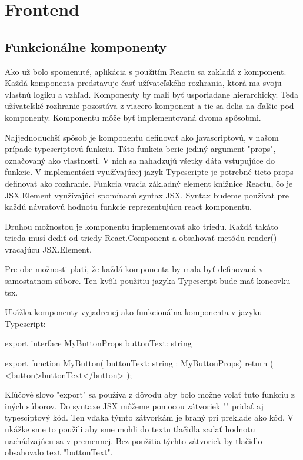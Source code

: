 \section{Frontend}

\subsection{Funkcionálne komponenty }

Ako už bolo spomenuté, aplikácia s použitím Reactu sa zakladá z komponent. Každá komponenta predstavuje časť užívateľského rozhrania, ktorá ma svoju vlastnú logiku a vzhľad. 
Komponenty by mali byť usporiadane hierarchicky. Teda užívateľské rozhranie pozostáva z viacero komponent a tie sa delia na ďalšie pod-komponenty. 
Komponentu môže byť implementovaná dvoma spôsobmi. 

Najjednoduchší spôsob je komponentu definovať ako javascriptovú, v našom prípade typescriptovú funkciu. 
Táto funkcia berie jediný argument "props", označovaný ako vlastnosti. V nich sa nahadzujú všetky dáta vstupujúce do funkcie. V implementácii využívajúcej jazyk Typescripte je potrebné tieto props definovať ako rozhranie. 
Funkcia vracia základný element knižnice Reactu, čo je JSX.Element využívajúci spomínanú syntax JSX. Syntax budeme používať pre každú návratovú hodnotu funkcie reprezentujúcu react komponentu. 

Druhou možnosťou je komponentu implementovať ako triedu. Každá takáto trieda musí dediť od triedy React.Component a obsahovať metódu render() vracajúcu JSX.Element. 

Pre obe možnosti platí, že každá komponenta by mala byť definovaná v samostatnom súbore. Ten kvôli použitiu jazyka Typescript bude mať koncovku tsx. 


Ukážka komponenty vyjadrenej ako funkcionálna komponenta v jazyku Typescript: 
\begin{code}
export interface MyButtonProps {
      buttonText: string
}

export function MyButton({ buttonText: string }: MyButtonProps) {
      return (
            <button>{buttonText}</button>
      );
}
\end{code}

Kľúčové slovo "export" sa používa z dôvodu aby bolo možne volať tuto funkciu z iných súborov. 
Do syntaxe JSX môžeme pomocou zátvoriek "{}" pridať aj typesciptový kód. Ten vďaka týmto zátvorkám je braný pri preklade ako kód. 
V ukážke sme to použili aby sme mohli do textu tlačidla zadať hodnotu nachádzajúcu sa v premennej. Bez použitia týchto zátvoriek by tlačidlo obsahovalo text "buttonText". 

